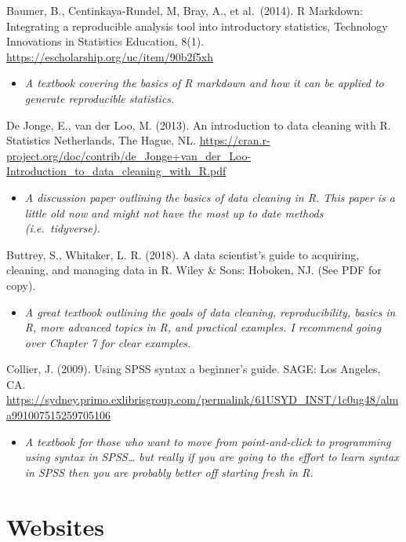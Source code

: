 \documentclass[
]{book}
\providecommand{\tightlist}{%
  \setlength{\itemsep}{0pt}\setlength{\parskip}{0pt}}
\begin{document}
Baumer, B., Centinkaya-Rundel, M, Bray, A., et al.~(2014). R Markdown: Integrating a reproducible analysis tool into introductory statistics, Technology Innovations in Statistics Education, 8(1). \url{https://escholarship.org/uc/item/90b2f5xh}

\begin{itemize}
\tightlist
\item
  \emph{A textbook covering the basics of R markdown and how it can be applied to generate reproducible statistics.}
\end{itemize}

De Jonge, E., van der Loo, M. (2013). An introduction to data cleaning with R. Statistics Netherlands, The Hague, NL. \url{https://cran.r-project.org/doc/contrib/de_Jonge+van_der_Loo-Introduction_to_data_cleaning_with_R.pdf}

\begin{itemize}
\tightlist
\item
  \emph{A discussion paper outlining the basics of data cleaning in R. This paper is a little old now and might not have the most up to date methods (i.e.~tidyverse).}
\end{itemize}

Buttrey, S., Whitaker, L. R. (2018). A data scientist's guide to acquiring, cleaning, and managing data in R. Wiley \& Sons: Hoboken, NJ. (See PDF for copy).

\begin{itemize}
\tightlist
\item
  \emph{A great textbook outlining the goals of data cleaning, reproducibility, basics in R, more advanced topics in R, and practical examples. I recommend going over Chapter 7 for clear examples.}
\end{itemize}

Collier, J. (2009). Using SPSS syntax a beginner's guide. SAGE: Los Angeles, CA. \url{https://sydney.primo.exlibrisgroup.com/permalink/61USYD_INST/1c0ug48/alma991007515259705106}

\begin{itemize}
\tightlist
\item
  \emph{A textbook for those who want to move from point-and-click to programming using syntax in SPSS\ldots{} but really if you are going to the effort to learn syntax in SPSS then you are probably better off starting fresh in R.}
\end{itemize}

\hypertarget{websites}{%
\section{Websites}\label{websites}}
\end{document}

